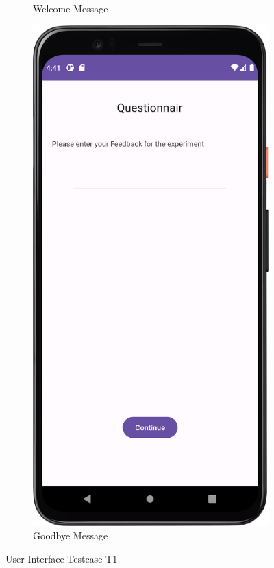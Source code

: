 \begin{figure}[htbp]
\begin{subfigure}[b]{0.25\textwidth}
        \caption{Welcome Message}
        \label{subfig:t2a}
    \end{subfigure}
    \hspace{1cm}
    \begin{subfigure}[b]{0.25\textwidth}
        \centering
        \includegraphics[width=\textwidth]{content/07_evaluation_of_the_solution/Screenshot_T2b.png}
        \caption{Goodbye Message}
        \label{subfig:t2b}
    \end{subfigure}
    \caption{User Interface Testcase T1}
    \label{fig:T2}
\end{figure}

